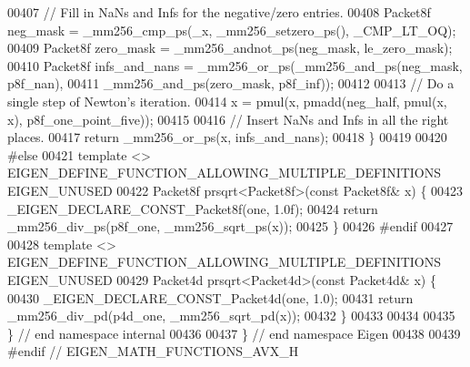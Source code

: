 \begin{DoxyCode}
00407   \textcolor{comment}{// Fill in NaNs and Infs for the negative/zero entries.}
00408   Packet8f neg\_mask = \_mm256\_cmp\_ps(\_x, \_mm256\_setzero\_ps(), \_CMP\_LT\_OQ);
00409   Packet8f zero\_mask = \_mm256\_andnot\_ps(neg\_mask, le\_zero\_mask);
00410   Packet8f infs\_and\_nans = \_mm256\_or\_ps(\_mm256\_and\_ps(neg\_mask, p8f\_nan),
00411                                         \_mm256\_and\_ps(zero\_mask, p8f\_inf));
00412 
00413   \textcolor{comment}{// Do a single step of Newton's iteration.}
00414   x = pmul(x, pmadd(neg\_half, pmul(x, x), p8f\_one\_point\_five));
00415 
00416   \textcolor{comment}{// Insert NaNs and Infs in all the right places.}
00417   \textcolor{keywordflow}{return} \_mm256\_or\_ps(x, infs\_and\_nans);
00418 \}
00419 
00420 \textcolor{preprocessor}{#else}
00421 \textcolor{keyword}{template} <> EIGEN\_DEFINE\_FUNCTION\_ALLOWING\_MULTIPLE\_DEFINITIONS EIGEN\_UNUSED
00422 Packet8f prsqrt<Packet8f>(\textcolor{keyword}{const} Packet8f& x) \{
00423   \_EIGEN\_DECLARE\_CONST\_Packet8f(one, 1.0f);
00424   \textcolor{keywordflow}{return} \_mm256\_div\_ps(p8f\_one, \_mm256\_sqrt\_ps(x));
00425 \}
00426 \textcolor{preprocessor}{#endif}
00427 
00428 \textcolor{keyword}{template} <> EIGEN\_DEFINE\_FUNCTION\_ALLOWING\_MULTIPLE\_DEFINITIONS EIGEN\_UNUSED
00429 Packet4d prsqrt<Packet4d>(\textcolor{keyword}{const} Packet4d& x) \{
00430   \_EIGEN\_DECLARE\_CONST\_Packet4d(one, 1.0);
00431   \textcolor{keywordflow}{return} \_mm256\_div\_pd(p4d\_one, \_mm256\_sqrt\_pd(x));
00432 \}
00433 
00434 
00435 \}  \textcolor{comment}{// end namespace internal}
00436 
00437 \}  \textcolor{comment}{// end namespace Eigen}
00438 
00439 \textcolor{preprocessor}{#endif  // EIGEN\_MATH\_FUNCTIONS\_AVX\_H}
\end{DoxyCode}
